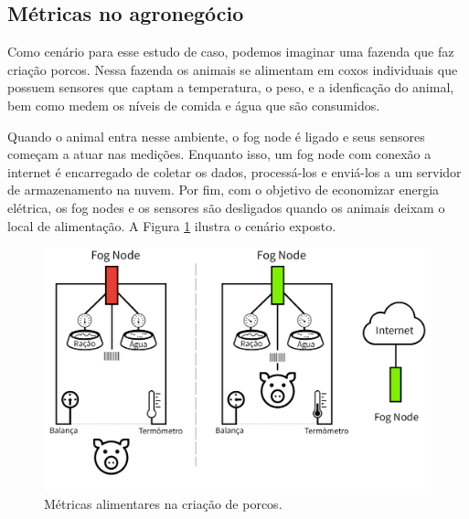 \subsection{Métricas no agronegócio}


Como cenário para esse estudo de caso, podemos imaginar uma fazenda que faz criação porcos.
Nessa fazenda os animais se alimentam em coxos individuais que possuem sensores que captam a temperatura, o peso, e a idenficação do animal, bem como medem os níveis de comida e água
que são consumidos.

Quando o animal entra nesse ambiente, o fog node é ligado e seus sensores começam a atuar nas medições.
Enquanto isso, um fog node com conexão a internet é encarregado de coletar os dados, processá-los e enviá-los a um servidor de armazenamento na nuvem.
Por fim, com o objetivo de economizar energia elétrica, os fog nodes e os sensores são desligados quando os animais deixam o local de alimentação.
A Figura \ref{fig:fig17} ilustra o cenário exposto.


\begin{figure}[H]
    \centering\includegraphics[width=1\textwidth]{fig17.png} 
    \caption[ Métricas alimentares na criação de porcos]
    {\label{fig:fig17} Métricas alimentares na criação de porcos.}
\end{figure}